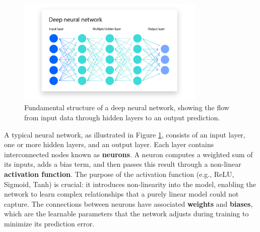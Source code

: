 \documentclass[12pt]{report}
\begin{document}
\begin{figure}[H]
    \centering
    \includegraphics[width=0.8\textwidth]{images/deep_learning-graph.png}
    \caption{Fundamental structure of a deep neural network, showing the flow from input data through hidden layers to an output prediction.}
    \label{fig:deep-learning-graph}
\end{figure}

A typical neural network, as illustrated in Figure \ref{fig:deep-learning-graph}, consists of an input layer, one or more hidden layers, and an output layer. Each layer contains interconnected nodes known as \textbf{neurons}. A neuron computes a weighted sum of its inputs, adds a bias term, and then passes this result through a non-linear \textbf{activation function}. The purpose of the activation function (e.g., ReLU, Sigmoid, Tanh) is crucial: it introduces non-linearity into the model, enabling the network to learn complex relationships that a purely linear model could not capture. The connections between neurons have associated \textbf{weights} and \textbf{biases}, which are the learnable parameters that the network adjusts during training to minimize its prediction error.
\end{document}

